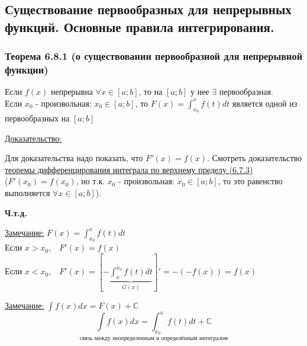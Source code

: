 \documentclass[12pt]{article}
\begin{document}
    \subsection{Существование первообразных для непрерывных функций. Основные правила интегрирования.}
    \subsubsection*{Теорема 6.8.1 (о существовании первообразной для непрерывной функции)}\label{th:6.8.1}
    Если $f(x)$ непрерывна $\forall x \in [a;b]$, то на $[a; b]$ у нее $\exists$ первообразная.\\
    Если $x_0$ - произвольная: $x_0 \in [a;b]$, то $F(x)=\int_{x_0}^{x}f(t)dt$ является одной из первообразных на $[a;b]$\par\noindent
    \underline{Доказательство:}
    \begin{adjustwidth}{1.5em}{1.5em}
        Для доказательства надо показать, что $F'(x)=f(x)$. Смотреть доказательство \hyperref[th:6.7.3]{теоремы дифференцирования интеграла по верхнему пределу (6.7.3)}\\
        ($F'(x_0)=f(x_0)$, но т.к. $x_0$ - произвольная: $x_0 \in [a;b]$, то это равенство выполняется $\forall x \in [a;b]$).
        \begin{center}
            \textbf{Ч.т.д.}
        \end{center}
    \end{adjustwidth}
    \underline{Замечание:} $F(x)=\int_{x_0}^{x}f(t)dt$\\
    Если $x>x_0, \;\;\; F'(x)=f(x)$\\
    Если $x<x_0, \;\;\; F'(x)=\left[-\underbrace{\int_{x}^{x_0}f(t)dt}_{G(x)}\right]'=-(-f(x))=f(x)$\par\noindent
    \underline{Замечание:} $\int f(x)dx=F(x)+\mathbb{C}$\\
    \[ \underset{\text{связь между неопределенным и определённым интегралом}}{\int f(x)dx = \int_{x_0}^{x}f(t)dt+\mathbb{C}} \]
\end{document}
